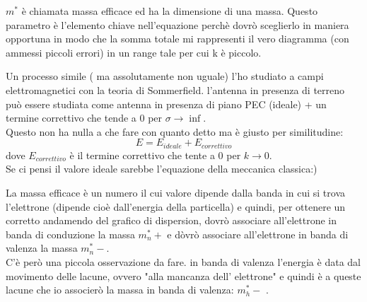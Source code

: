 $m^*$ è chiamata massa efficace ed ha la dimensione di una massa. Questo parametro è l'elemento chiave nell'equazione perchè dovrò sceglierlo in maniera opportuna in modo che la somma totale mi rappresenti il vero diagramma (con ammessi piccoli errori) in un range tale per cui k è piccolo.
\begin{psbox}
    Un processo simile ( ma assolutamente non uguale) l'ho studiato a campi elettromagnetici con la teoria di Sommerfield. l'antenna in presenza di terreno può essere studiata come antenna in presenza di piano PEC (ideale) + un termine correttivo che tende a 0 per $\sigma \rightarrow \inf$.\\

    Questo non ha nulla a che fare con quanto detto ma è giusto per similitudine:\\
    \[E = E_{ideale}+E_{correttivo}\]
    dove $E_{correttivo}$ è il termine correttivo che tente a 0 per $k \rightarrow 0$.\\
    Se ci pensi il valore ideale sarebbe l'equazione della meccanica classica:)
\end{psbox}
La massa efficace è un numero il cui valore dipende dalla banda in cui si trova l'elettrone (dipende cioè dall'energia della particella) e quindi, per ottenere un corretto andamendo del grafico di dispersion,  dovrò associare all'elettrone in banda di conduzione la massa $m_n^*+$ e dòvrò associare all'elettrone in banda di valenza la massa $m_n^*-$. \\
C'è però una piccola osservazione da fare. in banda di valenza l'energia è data dal movimento delle lacune, ovvero "alla mancanza dell' elettrone" e quindi è a queste lacune che io associerò la massa in banda di valenza: $m_h^*-$ .\\

